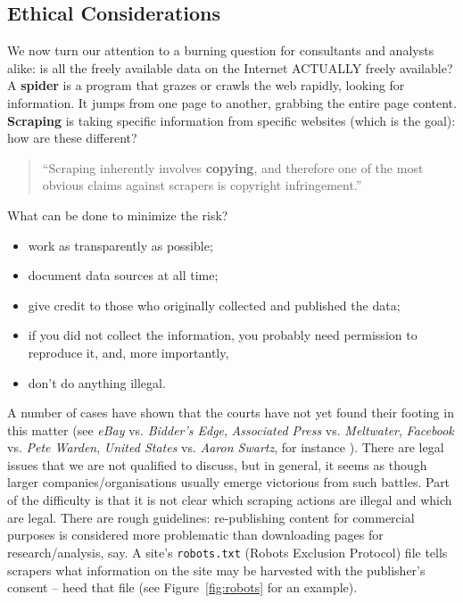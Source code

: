 \subsection{Ethical Considerations} We now turn our attention to a burning question for consultants and analysts alike: is all the freely available data on the Internet ACTUALLY freely available? 
\newl A \textbf{spider} is a program that grazes or crawls the web rapidly, looking for information. It jumps from one page to another, grabbing the entire page content. \textbf{Scraping} is taking specific information from specific websites (which is the goal): how are these different? 
\begin{quote}``Scraping inherently involves \textbf{copying}, and therefore one of the most obvious claims against scrapers is copyright infringement.'' \cite{DC_MRMN}\end{quote}
What can be done to minimize the risk? 
\begin{itemize}[noitemsep]
\item work as transparently as possible;
\item document data sources at all time;
\item give credit to those who originally collected and published the data;
\item if you did not collect the information, you probably need permission to reproduce it, and, more importantly, 
\item don't do anything illegal.
\end{itemize}
A number of  cases have shown that the courts have not yet found their footing in this matter  (see \textit{eBay} vs. \textit{Bidder's Edge}, \textit{Associated Press} vs. \textit{Meltwater}, \textit{Facebook} vs. \textit{Pete Warden}, \textit{United States} vs. \textit{Aaron Swartz}, for instance \cite{DC_M}). There are legal issues that we are not qualified to discuss, but in general, it seems as though larger companies/organisations usually emerge victorious from such battles. \newl Part of the difficulty is that it is not clear which scraping actions are illegal and which are legal. There are rough guidelines: re-publishing content for commercial purposes is considered more problematic than downloading pages for research/analysis, say. A site's  \texttt{robots.txt} (Robots Exclusion Protocol) file tells scrapers what information on the site may be harvested with the publisher's consent -- heed that file (see Figure~\ref{fig:robots} for an example).
